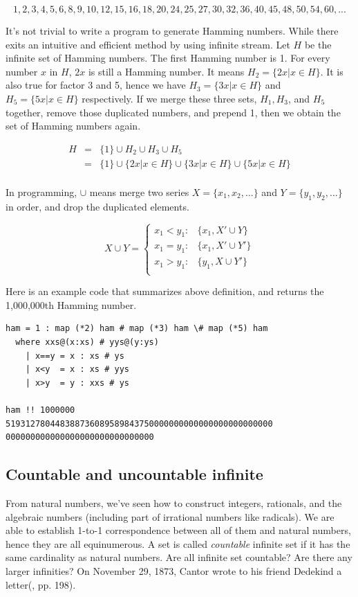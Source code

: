 \documentclass{article}
\begin{document}
\[
1, 2, 3, 4, 5, 6, 8, 9, 10, 12, 15, 16, 18, 20, 24, 25, 27, 30, 32, 36, 40, 45, 48, 50, 54, 60, ...
\]

It's not trivial to write a program to generate Hamming numbers. While there exits an intuitive and efficient method by using infinite stream. Let $H$ be the infinite set of Hamming numbers. The first Hamming number is 1. For every number $x$ in $H$, $2x$ is still a Hamming number. It means $H_2 = \{ 2x | x \in H \}$. It is also true for factor 3 and 5, hence we have $H_3 = \{ 3x | x \in H \}$ and $H_5 = \{ 5x | x \in H \}$ respectively. If we merge these three sets, $H_1, H_3$, and $H_5$ together, remove those duplicated numbers, and prepend 1, then we obtain the set of Hamming numbers again.

\[
\begin{array}{rcl}
H & = & \{ 1 \} \cup H_2 \cup H_3 \cup H_5 \\
  & = & \{ 1 \} \cup \{ 2x | x \in H \} \cup \{ 3x | x \in H \} \cup \{ 5x | x \in H \} \\
\end{array}
\]

In programming, $\cup$ means merge two series $X = \{x_1, x_2, ...\}$ and $Y = \{y_1, y_2, ...\}$ in order, and drop the duplicated elements.

\[
X \cup Y =
\begin{cases}
x_1 < y_1 : & \{x_1, X' \cup Y \} \\
x_1 = y_1 : & \{x_1, X' \cup Y' \} \\
x_1 > y_1 : & \{y_1, X \cup Y' \} \\
\end{cases}
\]

Here is an example code that summarizes above definition, and returns the 1,000,000th Hamming number.

\begin{lstlisting}
ham = 1 : map (*2) ham # map (*3) ham \# map (*5) ham
  where xxs@(x:xs) # yys@(y:ys)
    | x==y = x : xs # ys
    | x<y  = x : xs # yys
    | x>y  = y : xxs # ys

ham !! 1000000
519312780448388736089589843750000000000000000000000000
000000000000000000000000000000
\end{lstlisting}

\lstset{frame=none}

\subsection{Countable and uncountable infinite}
From natural numbers, we've seen how to construct integers, rationals, and the algebraic numbers (including part of irrational numbers like radicals). We are able to establish 1-to-1 correspondence between all of them and natural numbers, hence they are all equinumerous. A set is called {\em countable} infinite set if it has the same cardinality as natural numbers. Are all infinite set countable? Are there any larger infinities? On November 29, 1873, Cantor wrote to his friend Dedekind a letter(\cite{Calvin-Clawson-1994}, pp. 198).
\end{document}
